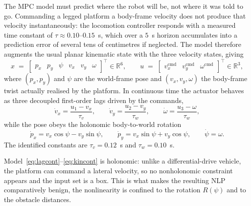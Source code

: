 \documentclass[11pt,a4paper]{article}
\newcommand{\R}{\mathbb{R}}
\begin{document}
The MPC model must predict where the robot will be, not where it was told to go. Commanding a legged platform
a body-frame velocity does not produce that velocity instantaneously: the locomotion controller responds with
a measured time constant of $\tau\approx0.10$--$0.15$~s, which over a $5$~s horizon accumulates into a
prediction error of several tens of centimetres if neglected. The model therefore augments the usual planar
kinematic state with the three velocity states, giving
\begin{equation}
  x \;=\; \begin{bmatrix} p_x & p_y & \psi & v_x & v_y & \omega\end{bmatrix}^{\!\top}\in\R^{6},
  \qquad
  u \;=\; \begin{bmatrix} v_x^{\mathrm{cmd}} & v_y^{\mathrm{cmd}} & \omega^{\mathrm{cmd}}\end{bmatrix}^{\!\top}\in\R^{3},
  \label{eq:state}
\end{equation}
where $(p_x,p_y)$ and $\psi$ are the world-frame pose and $(v_x,v_y,\omega)$ the body-frame twist actually
realised by the platform. In continuous time the actuator behaves as three decoupled first-order lags driven
by the commands,
\begin{equation}
  \dot v_x = \frac{u_1-v_x}{\tau_v},\qquad
  \dot v_y = \frac{u_2-v_y}{\tau_w},\qquad
  \dot \omega = \frac{u_3-\omega}{\tau_w},
  \label{eq:lagcont}
\end{equation}
while the pose obeys the holonomic body-to-world rotation
\begin{equation}
  \dot p_x = v_x\cos\psi - v_y\sin\psi,\qquad
  \dot p_y = v_x\sin\psi + v_y\cos\psi,\qquad
  \dot\psi = \omega .
  \label{eq:kincont}
\end{equation}
The identified constants are $\tau_v=0.12$~s and $\tau_w=0.10$~s.

Model~\eqref{eq:lagcont}--\eqref{eq:kincont} is holonomic: unlike a differential-drive vehicle, the platform
can command a lateral velocity, so no nonholonomic constraint appears and the input set is a box. This is what
makes the resulting NLP comparatively benign, the nonlinearity is confined to the rotation
$R(\psi)$ and to the obstacle distances.
\end{document}
